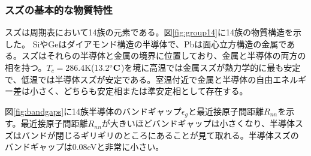 \subsubsection{スズの基本的な物質特性}
スズは周期表において14族の元素である。図\ref{fig:group14}に14族の物質構造を示した。%
SiやGeはダイアモンド構造の半導体で、Pbは面心立方構造の金属である。スズはそれらの半導体と金属の境界に位置しており、金属と半導体の両方の相を持つ。$T_c=$286.4K(13.2$^\circ \bf C$)を境に高温では金属スズが熱力学的に最も安定で、低温では半導体スズが安定である。室温付近で金属と半導体の自由エネルギー差は小さく、どちらも安定相または準安定相として存在する。

図\ref{fig:bandgaps}に14族半導体のバンドギャップ$\epsilon_g$と最近接原子間距離$R_{nn}$を示す\cite{Yonezawa}。最近接原子間距離$R_{nn}$が大きいほどバンドギャップは小さくなり、半導体スズはバンドが閉じるギリギリのところにあることが見て取れる。半導体スズのバンドギャップは0.08eVと非常に小さい。
